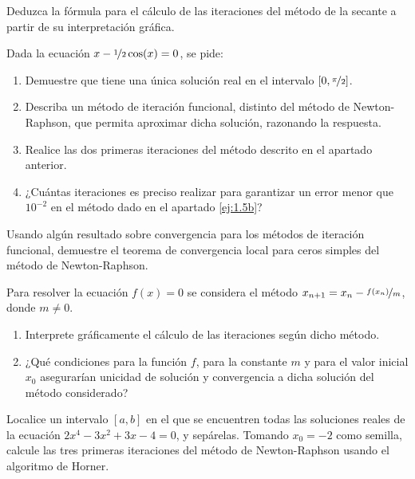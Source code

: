 \begin{ejercicio}\label{ej:1.4}
    Deduzca la fórmula para el cálculo de las iteraciones del método de la secante a partir de su interpretación gráfica.
\end{ejercicio}


\begin{ejercicio}\label{ej:1.5}
    Dada la ecuación $x - \nicefrac{1}{2}\cos(x) = 0$, se pide:
    \begin{enumerate}
        \item Demuestre que tiene una única solución real en el intervalo $\left[0,\nicefrac{\pi}{2}\right]$.
        \item\label{ej:1.5b}
        Describa un método de iteración funcional, distinto del método de Newton-Raphson, que permita aproximar dicha solución, razonando la respuesta.
        \item Realice las dos primeras iteraciones del método descrito en el apartado anterior.
        \item ¿Cuántas iteraciones es preciso realizar para garantizar un error menor que $10^{-2}$ en el método dado en el apartado \ref{ej:1.5b}?
    \end{enumerate}
\end{ejercicio}

\begin{ejercicio}\label{ej:1.6}
    Usando algún resultado sobre convergencia para los métodos de iteración funcional, demuestre el teorema de convergencia local para ceros simples del método de Newton-Raphson.
\end{ejercicio}

\begin{ejercicio}\label{ej:1.7}
    Para resolver la ecuación $f(x) = 0$ se considera el método $x_{n+1} = x_n - \nicefrac{f(x_n)}{m}$, donde $m \neq 0$.
    \begin{enumerate}
        \item Interprete gráficamente el cálculo de las iteraciones según dicho método.
        \item ¿Qué condiciones para la función $f$, para la constante $m$ y para el valor inicial $x_0$ asegurarían unicidad de solución y convergencia a dicha solución del método considerado?
    \end{enumerate}
\end{ejercicio}

\begin{ejercicio}\label{ej:1.8}
    Localice un intervalo $[a, b]$ en el que se encuentren todas las soluciones reales de la ecuación $2x^4 - 3x^2 + 3x - 4 = 0$, y sepárelas. Tomando $x_0 = -2$ como semilla, calcule las tres primeras iteraciones del método de Newton-Raphson usando el algoritmo de Horner.
\end{ejercicio}

